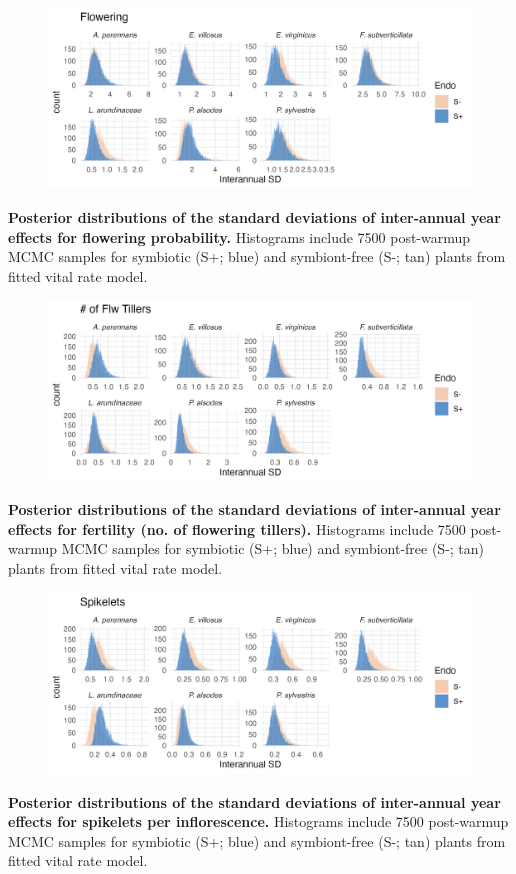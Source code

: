 \documentclass[12pt]{article}
\begin{document}
\begin{figure}[H]
	\centering
	\includegraphics[width=.9\linewidth]{flow_sigmayear_hist.png}
\end{figure}
 \textbf{Posterior distributions of the standard deviations of inter-annual year effects for flowering probability.} Histograms include 7500 post-warmup MCMC samples for symbiotic (S+; blue) and symbiont-free (S-; tan) plants from fitted vital rate model.


\begin{figure}[H]
	\centering
	\includegraphics[width=.9\linewidth]{fert_sigmayear_hist.png}
\end{figure}
 \textbf{Posterior distributions of the standard deviations of inter-annual year effects for fertility (no. of flowering tillers).} Histograms include 7500 post-warmup MCMC samples for symbiotic (S+; blue) and symbiont-free (S-; tan) plants from fitted vital rate model.
\newpage

\begin{figure}[H]
	\centering
	\includegraphics[width=.9\linewidth]{spike_sigmayear_hist.png}
\end{figure}
 \textbf{Posterior distributions of the standard deviations of inter-annual year effects for spikelets per inflorescence.} Histograms include 7500 post-warmup MCMC samples for symbiotic (S+; blue) and symbiont-free (S-; tan) plants from fitted vital rate model.
\end{document}
